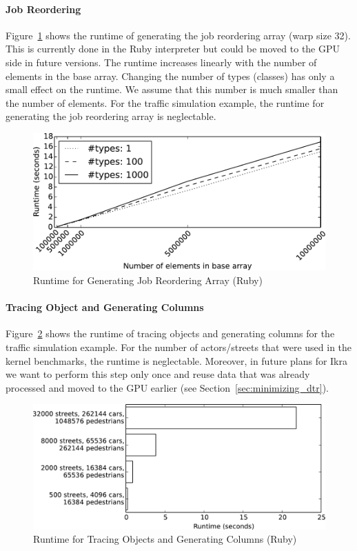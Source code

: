 \documentclass[preprint]{sigplanconf}
\begin{document}
\paragraph{Job Reordering}
Figure~\ref{fig:job_reorder_arr} shows the runtime of generating the job reordering array (warp size 32). This is currently done in the Ruby interpreter but could be moved to the GPU side in future versions. The runtime increases linearly with the number of elements in the base array. Changing the number of types (classes) has only a small effect on the runtime. We assume that this number is much smaller than the number of elements. For the traffic simulation example, the runtime for generating the job reordering array is neglectable.

\begin{figure}[!htp]
    \includegraphics[width=0.9\columnwidth]{plot_reorder.pdf}
    \centering
    \caption{Runtime for Generating Job Reordering Array (Ruby)}
    \label{fig:job_reorder_arr}
\end{figure}

\paragraph{Tracing Object and Generating Columns}
Figure~\ref{fig:tracing} shows the runtime of tracing objects and generating columns for the traffic simulation example. For the number of actors/streets that were used in the kernel benchmarks, the runtime is neglectable. Moreover, in future plans for Ikra we want to perform this step only once and reuse data that was already processed and moved to the GPU earlier (see Section~\ref{sec:minimizing_dtr}).

\begin{figure}[!htp]
    \includegraphics[width=\columnwidth]{obj_tracer.pdf}
    \centering
    \caption{Runtime for Tracing Objects and Generating Columns (Ruby)}
    \label{fig:tracing}
\end{figure}
\end{document}
